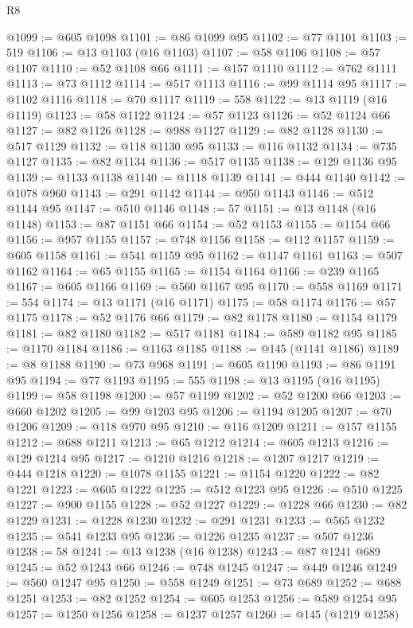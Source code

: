 \begin{lexlean}{R8}
\begin{coremodule}
@1099 := @605 @1098
@1101 := @86 @1099 @95
@1102 := @77 @1101
@1103 := 519
@1106 := @13 @1103 (@16 @1103)
@1107 := @58 @1106
@1108 := @57 @1107
@1110 := @52 @1108 @66
@1111 := @157 @1110
@1112 := @762 @1111
@1113 := @73 @1112
@1114 := @517 @1113
@1116 := @99 @1114 @95
@1117 := @1102 @1116
@1118 := @70 @1117
@1119 := 558
@1122 := @13 @1119 (@16 @1119)
@1123 := @58 @1122
@1124 := @57 @1123
@1126 := @52 @1124 @66
@1127 := @82 @1126
@1128 := @988 @1127
@1129 := @82 @1128
@1130 := @517 @1129
@1132 := @118 @1130 @95
@1133 := @116 @1132
@1134 := @735 @1127
@1135 := @82 @1134
@1136 := @517 @1135
@1138 := @129 @1136 @95
@1139 := @1133 @1138
@1140 := @1118 @1139
@1141 := @444 @1140
@1142 := @1078 @960
@1143 := @291 @1142
@1144 := @950 @1143
@1146 := @512 @1144 @95
@1147 := @510 @1146
@1148 := 57
@1151 := @13 @1148 (@16 @1148)
@1153 := @87 @1151 @66
@1154 := @52 @1153
@1155 := @1154 @66
@1156 := @957 @1155
@1157 := @748 @1156
@1158 := @112 @1157
@1159 := @605 @1158
@1161 := @541 @1159 @95
@1162 := @1147 @1161
@1163 := @507 @1162
@1164 := @65 @1155
@1165 := @1154 @1164
@1166 := @239 @1165
@1167 := @605 @1166
@1169 := @560 @1167 @95
@1170 := @558 @1169
@1171 := 554
@1174 := @13 @1171 (@16 @1171)
@1175 := @58 @1174
@1176 := @57 @1175
@1178 := @52 @1176 @66
@1179 := @82 @1178
@1180 := @1154 @1179
@1181 := @82 @1180
@1182 := @517 @1181
@1184 := @589 @1182 @95
@1185 := @1170 @1184
@1186 := @1163 @1185
@1188 := @145 (@1141 @1186)
@1189 := @8 @1188
@1190 := @73 @968
@1191 := @605 @1190
@1193 := @86 @1191 @95
@1194 := @77 @1193
@1195 := 555
@1198 := @13 @1195 (@16 @1195)
@1199 := @58 @1198
@1200 := @57 @1199
@1202 := @52 @1200 @66
@1203 := @660 @1202
@1205 := @99 @1203 @95
@1206 := @1194 @1205
@1207 := @70 @1206
@1209 := @118 @970 @95
@1210 := @116 @1209
@1211 := @157 @1155
@1212 := @688 @1211
@1213 := @65 @1212
@1214 := @605 @1213
@1216 := @129 @1214 @95
@1217 := @1210 @1216
@1218 := @1207 @1217
@1219 := @444 @1218
@1220 := @1078 @1155
@1221 := @1154 @1220
@1222 := @82 @1221
@1223 := @605 @1222
@1225 := @512 @1223 @95
@1226 := @510 @1225
@1227 := @900 @1155
@1228 := @52 @1227
@1229 := @1228 @66
@1230 := @82 @1229
@1231 := @1228 @1230
@1232 := @291 @1231
@1233 := @565 @1232
@1235 := @541 @1233 @95
@1236 := @1226 @1235
@1237 := @507 @1236
@1238 := 58
@1241 := @13 @1238 (@16 @1238)
@1243 := @87 @1241 @689
@1245 := @52 @1243 @66
@1246 := @748 @1245
@1247 := @449 @1246
@1249 := @560 @1247 @95
@1250 := @558 @1249
@1251 := @73 @689
@1252 := @688 @1251
@1253 := @82 @1252
@1254 := @605 @1253
@1256 := @589 @1254 @95
@1257 := @1250 @1256
@1258 := @1237 @1257
@1260 := @145 (@1219 @1258)

\end{coremodule}
\end{lexlean}
